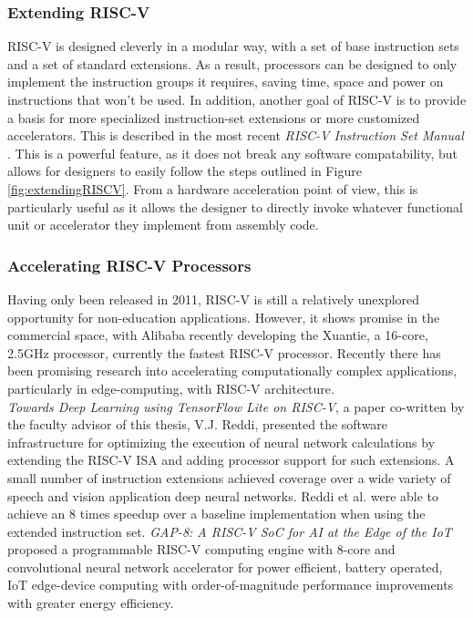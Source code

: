     \subsubsection*{Extending RISC-V}
    RISC-V is designed cleverly in a modular way, with a set of base instruction sets and a set of standard extensions. As a result, processors can be designed to only implement the instruction groups it requires, saving time, space and power on instructions that won't be used. In addition, another goal of RISC-V is to provide a basis for more specialized instruction-set extensions or more customized accelerators. This is described in the most recent \textit{RISC-V Instruction Set Manual} \cite{Waterman2019}. This is a powerful feature, as it does not break any software compatability, but allows for designers to easily follow the steps outlined in Figure \ref{fig:extendingRISCV}. From a \gls{hardware acceleration} point of view, this is particularly useful as it allows the designer to directly invoke whatever functional unit or accelerator they implement from assembly code.
    

    \subsubsection*{Accelerating RISC-V Processors}
    Having only been released in 2011, RISC-V is still a relatively unexplored opportunity for non-education applications. However, it shows promise in the commercial space, with Alibaba recently developing the Xuantie, a 16-core, 2.5GHz processor, currently the fastest RISC-V processor. Recently there has been promising research into accelerating computationally complex applications, particularly in edge-computing, with RISC-V architecture. \\
    \textit{Towards Deep Learning using TensorFlow Lite on RISC-V}, a paper co-written by the faculty advisor of this thesis, V.J. Reddi, presented the software infrastructure for optimizing the execution of neural network calculations by extending the RISC-V ISA and adding processor support for such extensions. A small number of instruction extensions achieved coverage over a wide variety of speech and vision application deep neural networks. Reddi et al. were able to achieve an 8 times speedup over a baseline implementation when using the extended instruction set.
    \textit{GAP-8: A RISC-V SoC for AI at the Edge of the IoT} proposed a programmable RISC-V computing engine with 8-core and convolutional neural network accelerator for power efficient, battery operated, IoT edge-device computing with order-of-magnitude performance improvements with greater energy efficiency. \\

